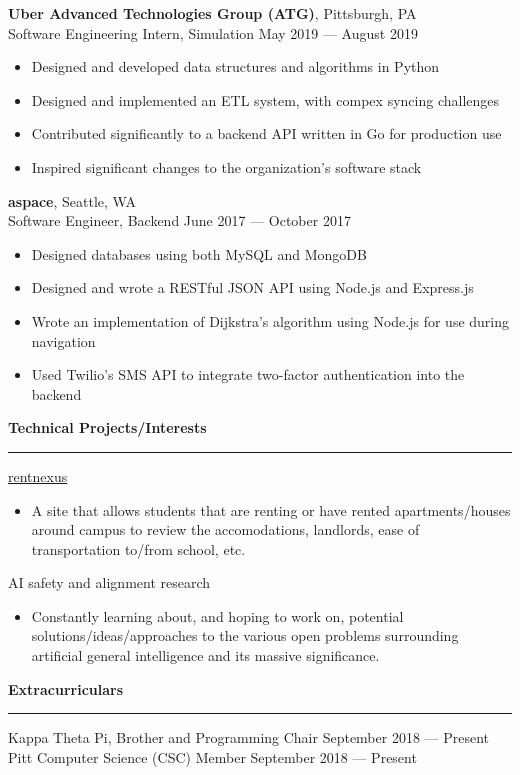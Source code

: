 \documentclass[11pt]{article}
\begin{document}
	\vspace{-0.5mm}
	\begin{flushleft}
		\textbf{Uber Advanced Technologies Group (ATG)}, Pittsburgh, PA\\
		Software Engineering Intern, Simulation \hfill May 2019 --- August 2019
		\begin{itemize}
			\item Designed and developed data structures and algorithms in Python
			\item Designed and implemented an ETL system, with compex syncing challenges
			\item Contributed significantly to a backend API written in Go for production use
			\item Inspired significant changes to the organization's software stack
		\end{itemize}

		\textbf{aspace}, Seattle, WA\\
		Software Engineer, Backend \hfill June 2017 --- October 2017
		\begin{itemize}
			\item Designed databases using both MySQL and MongoDB
			\item Designed and wrote a RESTful JSON API using Node.js and Express.js
			\item Wrote an implementation of Dijkstra's algorithm using Node.js for use during navigation
			\item Used Twilio's SMS API to integrate two-factor authentication into the backend
		\end{itemize}
	\end{flushleft}
	
	\vspace{-1mm}
	{\large \raggedright \textbf{Technical Projects/Interests}}
	\vspace{1.5mm}

	\hrule

	\vspace{-0.5mm}
	\begin{flushleft}
		\href{https://rentnexus.net}{rentnexus}
		\begin{itemize}
			\item A site that allows students that are renting or have rented apartments/houses around campus to review the accomodations, landlords, ease of transportation to/from school, etc.
		\end{itemize}
		AI safety and alignment research
		\begin{itemize}
			\item Constantly learning about, and hoping to work on, potential solutions/ideas/approaches to the various open problems surrounding artificial general intelligence and its massive significance.
		\end{itemize}
	\end{flushleft}
	
	\vspace{-1mm}
	{\large \raggedright \textbf{Extracurriculars}}
	\vspace{1.5mm}

	\hrule

	\vspace{-0.5mm}
	\begin{flushleft}
		Kappa Theta Pi, Brother and Programming Chair \hfill September 2018 --- Present\\
		Pitt Computer Science (CSC) Member \hfill September 2018 --- Present
	\end{flushleft}
\end{document}
